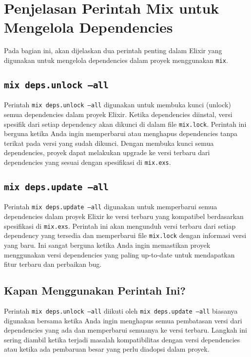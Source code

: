 
\chapter{Penjelasan Perintah Mix untuk Mengelola Dependencies}

Pada bagian ini, akan dijelaskan dua perintah penting dalam Elixir yang digunakan untuk mengelola dependencies dalam proyek menggunakan \texttt{mix}.

\section{\texttt{mix deps.unlock --all}}

Perintah \texttt{mix deps.unlock --all} digunakan untuk membuka kunci (unlock) semua dependencies dalam proyek Elixir. Ketika dependencies diinstal, versi spesifik dari setiap dependency akan dikunci di dalam file \texttt{mix.lock}. Perintah ini berguna ketika Anda ingin memperbarui atau menghapus dependencies tanpa terikat pada versi yang sudah dikunci. Dengan membuka kunci semua dependencies, proyek dapat melakukan upgrade ke versi terbaru dari dependencies yang sesuai dengan spesifikasi di \texttt{mix.exs}.

\section{\texttt{mix deps.update --all}}

Perintah \texttt{mix deps.update --all} digunakan untuk memperbarui semua dependencies dalam proyek Elixir ke versi terbaru yang kompatibel berdasarkan spesifikasi di \texttt{mix.exs}. Perintah ini akan mengunduh versi terbaru dari setiap dependency yang tersedia dan memperbarui file \texttt{mix.lock} dengan informasi versi yang baru. Ini sangat berguna ketika Anda ingin memastikan proyek menggunakan versi dependencies yang paling up-to-date untuk mendapatkan fitur terbaru dan perbaikan bug.

\section{Kapan Menggunakan Perintah Ini?}

Perintah \texttt{mix deps.unlock --all} diikuti oleh \texttt{mix deps.update --all} biasanya digunakan bersama ketika Anda ingin menghapus semua pembatasan versi dari dependencies yang ada dan memperbarui semuanya ke versi terbaru. Langkah ini sering diambil ketika terjadi masalah kompatibilitas dengan versi dependencies atau ketika ada pembaruan besar yang perlu diadopsi dalam proyek.

